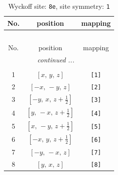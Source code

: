 \documentclass[fleqn,8pt]{jsarticle}
\begin{document}
\renewcommand{\arraystretch}{1.2}
\begin{longtable}{ccc}
\caption{Wyckoff site: {\tt 8e}, site symmetry: {\tt 1}}
 \\
 \hline \hline
No. & position & mapping \\ \hline \endfirsthead

\multicolumn{2}{l}{\tablename\ \thetable{}} \\
 \hline \hline
No. & position & mapping \\ \hline \endhead

 \hline \hline
\multicolumn{2}{r}{\footnotesize\it continued ...} \\ \endfoot

 \hline \hline
\multicolumn{2}{r}{} \\ \endlastfoot

1 & $\left[ x,\, y,\, z \right]$ & {\tt [1]} \\ \hline
2 & $\left[ - x,\, - y,\, z \right]$ & {\tt [2]} \\ \hline
3 & $\left[ - y,\, x,\, z + \frac{1}{2} \right]$ & {\tt [3]} \\ \hline
4 & $\left[ y,\, - x,\, z + \frac{1}{2} \right]$ & {\tt [4]} \\ \hline
5 & $\left[ x,\, - y,\, z + \frac{1}{2} \right]$ & {\tt [5]} \\ \hline
6 & $\left[ - x,\, y,\, z + \frac{1}{2} \right]$ & {\tt [6]} \\ \hline
7 & $\left[ - y,\, - x,\, z \right]$ & {\tt [7]} \\ \hline
8 & $\left[ y,\, x,\, z \right]$ & {\tt [8]} \\
\end{longtable}
\end{document}
